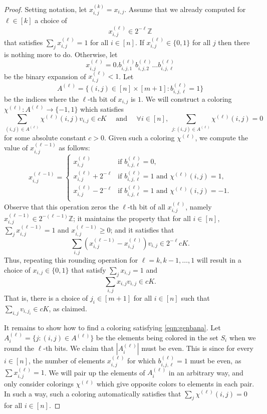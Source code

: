 \documentclass{toc}
\begin{document}
\begin{proof}
Setting notation, let $x^{(k)}_{i,j} = x_{i,j}$. Assume that we already computed for $\ell \in [k]$ a choice of
\[
  x^{(\ell)}_{i,j} \in 2^{-\ell} \mathbb{Z}
\]
that satisfies $\sum_j x^{(\ell)}_{i,j}=1$ for all $i \in [n]$. If
$x^{(\ell)}_{i,j} \in \{0,1\}$ for all $j$ then there is nothing more
to do.  Otherwise, let
\[
  x^{(\ell)}_{i,j}=0.b^{(\ell)}_{i,j,1}b^{(\ell)}_{i,j,2}\dots b^{(\ell)}_{i,j,\ell}
\]
be the binary expansion of $x^{(\ell)}_{i,j}<1$.  Let
\[
  A^{(\ell)}=\{(i,j) \in [n] \times [m+1]: b^{(\ell)}_{i,j,\ell}=1\}
\]
be the indices where the $\ell$-th bit of $x_{i,j}$ is $1$.  We will
construct a coloring $\chi^{(\ell)}:A^{(\ell)} \to \{-1,1\}$ which
satisfies
\begin{equation}
\label{eqn:genbana}
 \sum_{(i,j) \in A^{(\ell)}} \chi^{(\ell)}(i,j) v_{i,j} \in c K \quad\text{ and }\quad \forall i\in[n], \; \sum_{j: (i,j) \in A^{(\ell)}}\chi^{(\ell)}(i,j)=0
\end{equation}
for some absolute constant $c>0$. Given such a coloring $\chi^{(\ell)}$, we compute the value of $x^{(\ell-1)}_{i,j}$ as follows:
\[
x^{(\ell-1)}_{i,j} =
\begin{cases}
x^{(\ell)}_{i,j} & \text{if } b_{i,j,\ell}^{(\ell)}=0,\\
x^{(\ell)}_{i,j}+2^{-\ell} & \text{if } b_{i,j,\ell}^{(\ell)}=1 \text{ and } \chi^{(\ell)}(i,j)=1,\\
x^{(\ell)}_{i,j}-2^{-\ell} & \text{if } b_{i,j,\ell}^{(\ell)}=1 \text{ and } \chi^{(\ell)}(i,j)=-1.\\
\end{cases}
\]
Observe that this operation zeros the $\ell$-th bit of all $x^{(\ell)}_{i,j}$, namely $x^{(\ell-1)}_{i,j} \in 2^{-(\ell-1)} \mathbb{Z}$;
it maintains the property that for all $i \in [n]$, $\sum_{j} x^{(\ell-1)}_{i,j}=1$ and $x_{i,j}^{(\ell-1)} \ge 0$;
and it satisfies that
$$
\sum_{i,j} \left( x^{(\ell-1)}_{i,j} - x^{(\ell)}_{i,j} \right) v_{i,j} \in 2^{-\ell} cK.
$$
Thus, repeating this rounding operation for $\ell=k,k-1,\ldots,1$ will result in a choice of $x_{i,j} \in \{0,1\}$ that satisfy $\sum_j x_{i,j}=1$ and
$$
\sum_{i,j} x_{i,j} v_{i,j} \in c K.
$$
That is, there is a choice of $j_i \in [m+1]$ for all $i \in [n]$ such that $\sum_{i,j} v_{i,j_i} \in c K$, as claimed.

It remains to show how to find a coloring satisfying \eqref{eqn:genbana}. Let $A^{(\ell)}_i=\{j: (i,j) \in A^{(\ell)}\}$ be the elements being colored in the set $S_i$ when we
round the $\ell$-th bits. We claim that $|A^{(\ell)}_i|$ must be even. This is since for every $i \in [n]$, the number of elements $x^{(\ell)}_{i,j}$
for which $b^{(\ell)}_{i,j,\ell}=1$ must be even, as $\sum x^{(\ell)}_{i,j}=1$. We will pair up the elements of $A^{(\ell)}_i$ in an arbitrary way, and only consider
colorings $\chi^{(\ell)}$ which give opposite colors to elements in each pair. In such a way, such a coloring automatically satisfies that $\sum_j \chi^{(\ell)}(i,j)=0$ for all $i \in [n]$.


\end{proof}
\end{document}
